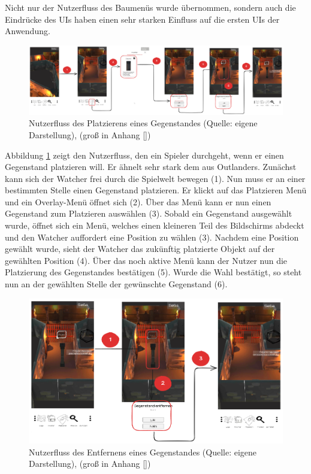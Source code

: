 Nicht nur der Nutzerfluss des Baumenüs wurde übernommen, sondern auch die Eindrücke des \ac{UI}s haben einen sehr starken Einfluss auf die ersten \ac{UI}s der Anwendung.

\begin{figure}[ht]
\centering
\includegraphics[width=1\linewidth]{content/pictures/PlacementFlow.png}
\caption{Nutzerfluss des Platzierens eines Gegenstandes (Quelle: eigene Darstellung), (groß in Anhang \ref{})}
\label{fig:userflow-placement-cm}
\end{figure}

Abbildung \ref{fig:userflow-placement-cm} zeigt den Nutzerfluss, den ein Spieler durchgeht, wenn er einen Gegenstand platzieren will. Er ähnelt sehr stark dem aus Outlanders. Zunächst kann sich der Watcher frei durch die Spielwelt bewegen (1). Nun muss er an einer bestimmten Stelle einen Gegenstand platzieren. Er klickt auf das Platzieren Menü und ein Overlay-Menü öffnet sich (2). Über das Menü kann er nun einen Gegenstand zum Platzieren auswählen (3). Sobald ein Gegenstand ausgewählt wurde, öffnet sich ein Menü, welches einen kleineren Teil des Bildschirms abdeckt und den Watcher auffordert eine Position zu wählen (3). Nachdem eine Position gewählt wurde, sieht der Watcher das zukünftig platzierte Objekt auf der gewählten Position (4). Über das noch aktive Menü kann der Nutzer nun die Platzierung des Gegenstandes bestätigen (5). Wurde die Wahl bestätigt, so steht nun an der gewählten Stelle der gewünschte Gegenstand (6). 

\begin{figure}[ht]
\centering
\includegraphics[width=1\linewidth]{content/pictures/RemovePlacementFlow.png}
\caption{Nutzerfluss des Entfernens eines Gegenstandes (Quelle: eigene Darstellung), (groß in Anhang \ref{})}
\label{fig:userflow-removement-cm}
\end{figure}

